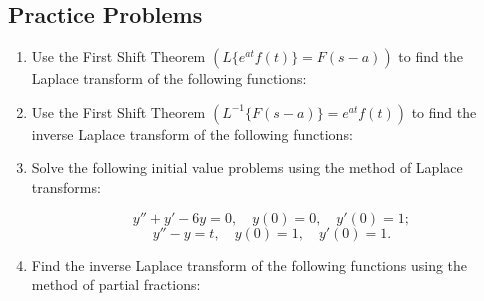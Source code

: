 \documentclass[a4paper, 10pt]{article}
\begin{document}
\subsection{Practice Problems}
\begin{enumerate}
  \item Use the First Shift Theorem \(\left( L \{ e^{at} f(t) \} = F(s - a) \right)\) to find the Laplace transform of the following functions:

  \item Use the First Shift Theorem \(\left( L^{-1} \{ F(s - a) \} = e^{at} f(t) \right)\) to find the inverse Laplace transform of the following functions:

  \item Solve the following initial value problems using the method of Laplace transforms:

        $$
          y'' + y' - 6y = 0 , \quad  y(0) = 0 , \quad  y'(0) = 1 ;
        $$
        $$
          y'' - y = t , \quad  y(0) = 1 , \quad  y'(0) = 1 .
        $$
  \item Find the inverse Laplace transform of the following functions using the method of partial fractions:

\end{enumerate}
\end{document}
